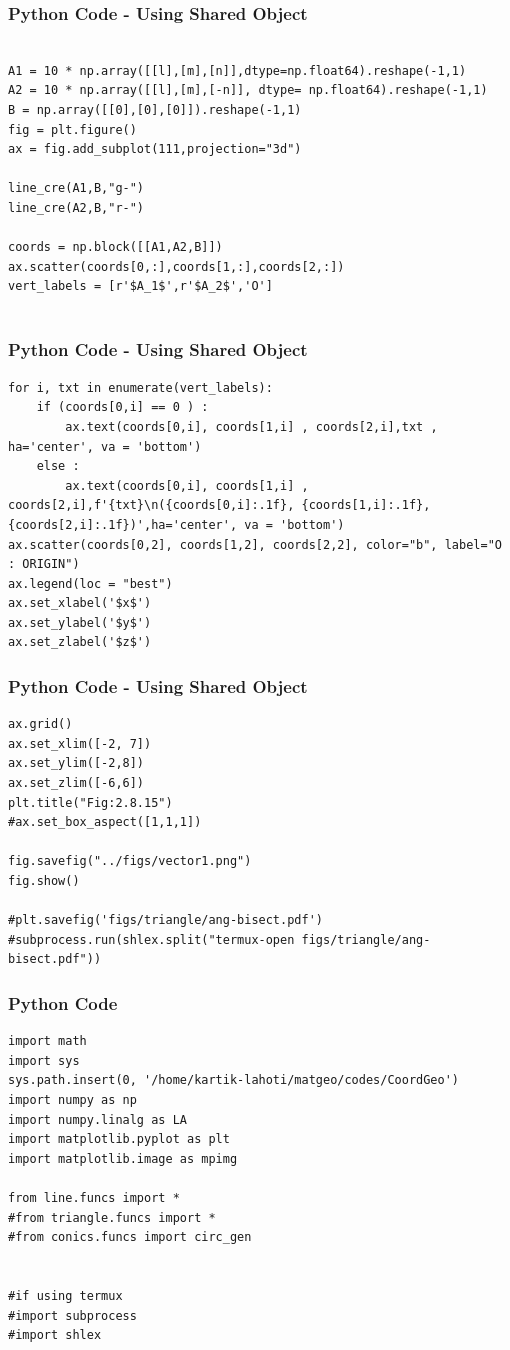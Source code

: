 \documentclass{beamer}
\begin{document}
\begin{frame}[fragile]
    \frametitle{Python Code - Using Shared Object}
    \begin{lstlisting}

A1 = 10 * np.array([[l],[m],[n]],dtype=np.float64).reshape(-1,1)
A2 = 10 * np.array([[l],[m],[-n]], dtype= np.float64).reshape(-1,1)
B = np.array([[0],[0],[0]]).reshape(-1,1)
fig = plt.figure()
ax = fig.add_subplot(111,projection="3d")

line_cre(A1,B,"g-")
line_cre(A2,B,"r-")

coords = np.block([[A1,A2,B]])
ax.scatter(coords[0,:],coords[1,:],coords[2,:])
vert_labels = [r'$A_1$',r'$A_2$','O']


\end{lstlisting}
\end{frame}

\begin{frame}[fragile]
    \frametitle{Python Code - Using Shared Object}
    \begin{lstlisting}
for i, txt in enumerate(vert_labels):
    if (coords[0,i] == 0 ) :
        ax.text(coords[0,i], coords[1,i] , coords[2,i],txt , ha='center', va = 'bottom')
    else :
        ax.text(coords[0,i], coords[1,i] , coords[2,i],f'{txt}\n({coords[0,i]:.1f}, {coords[1,i]:.1f}, {coords[2,i]:.1f})',ha='center', va = 'bottom')
ax.scatter(coords[0,2], coords[1,2], coords[2,2], color="b", label="O : ORIGIN")
ax.legend(loc = "best")
ax.set_xlabel('$x$')
ax.set_ylabel('$y$')
ax.set_zlabel('$z$')
\end{lstlisting}
\end{frame}

\begin{frame}[fragile]
    \frametitle{Python Code - Using Shared Object}
    \begin{lstlisting}
ax.grid()
ax.set_xlim([-2, 7])
ax.set_ylim([-2,8])
ax.set_zlim([-6,6])
plt.title("Fig:2.8.15")
#ax.set_box_aspect([1,1,1])

fig.savefig("../figs/vector1.png")
fig.show()

#plt.savefig('figs/triangle/ang-bisect.pdf')
#subprocess.run(shlex.split("termux-open figs/triangle/ang-bisect.pdf"))

\end{lstlisting}
\end{frame}




\begin{frame}[fragile]
    \frametitle{Python Code}
    \begin{lstlisting}
import math
import sys
sys.path.insert(0, '/home/kartik-lahoti/matgeo/codes/CoordGeo')
import numpy as np
import numpy.linalg as LA
import matplotlib.pyplot as plt
import matplotlib.image as mpimg

from line.funcs import *
#from triangle.funcs import *
#from conics.funcs import circ_gen


#if using termux
#import subprocess
#import shlex


\end{lstlisting}
\end{frame}
\end{document}
